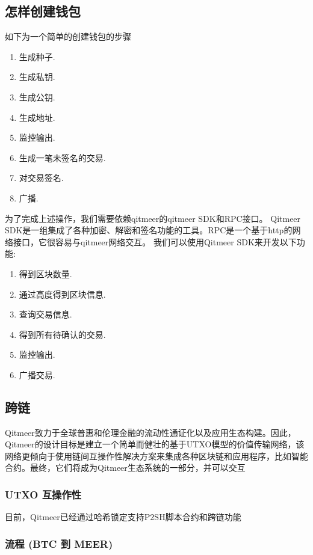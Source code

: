 \documentclass[a4paper,11pt]{article}
\begin{document}
\subsection*{怎样创建钱包}
   如下为一个简单的创建钱包的步骤
\begin{enumerate}
	\item  生成种子.
    \item  生成私钥.
    \item  生成公钥.
    \item  生成地址.
    \item  监控输出.
    \item  生成一笔未签名的交易.
    \item  对交易签名.
    \item  广播.
\end{enumerate}

   为了完成上述操作，我们需要依赖qitmeer的qitmeer SDK和RPC接口。
Qitmeer SDK是一组集成了各种加密、解密和签名功能的工具。RPC是一个基于http的网络接口，它很容易与qitmeer网络交互。
我们可以使用Qitmeer SDK来开发以下功能:

   \begin{enumerate}
    \item  得到区块数量.
    \item  通过高度得到区块信息.
    \item  查询交易信息.
    \item  得到所有待确认的交易.
    \item  监控输出.
    \item  广播交易.
   \end{enumerate}


\subsection{跨链}

Qitmeer致力于全球普惠和伦理金融的流动性通证化以及应用生态构建。因此，Qitmeer的设计目标是建立一个简单而健壮的基于UTXO模型的价值传输网络，该网络更倾向于使用链间互操作性解决方案来集成各种区块链和应用程序，比如智能合约。最终，它们将成为Qitmeer生态系统的一部分，并可以交互

\subsubsection{UTXO 互操作性}
目前，Qitmeer已经通过哈希锁定支持P2SH脚本合约和跨链功能

\subsubsection*{流程 (BTC 到 MEER)}
\end{document}
